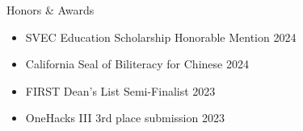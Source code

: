\documentclass[
	11pt, %
]{tex/resume} %
\begin{document}

\begin{rSection}{Honors \& Awards}

    \begin{itemize}
        \setlength\itemsep{-0.7em} %
        \item SVEC Education Scholarship Honorable Mention \hfill 2024
        \item California Seal of Biliteracy for Chinese \hfill 2024
        \item FIRST Dean's List Semi-Finalist \hfill 2023
        \item OneHacks III 3rd place submission \hfill 2023


    \end{itemize}

\end{rSection}





\end{document}
